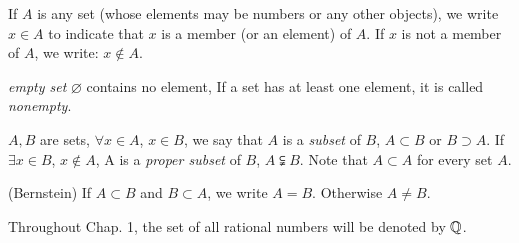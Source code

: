 



\begin{mydef}
    \label{mydef:1.3}
    If $A$ is any set (whose elements may be numbers or any other objects), 
    we write $x\in A$ to indicate that $x$ is a member (or an element) of $A$.
    If $x$ is not a member of $A$, we write: $x\notin A$.

    \emph{empty set} $\varnothing$ contains no element, If a set has at least one element, it is called \emph{nonempty}.

    $A,B$ are sets, 
    $\forall x\in A$, $x\in B$, we say that $A$ is a \emph{subset} of $B$, $A \subset B$ or $B \supset A$. 
    If $\exists x\in B$, $x\notin A$, A is a \emph{proper subset} of $B$, $A \subsetneqq B$.
    Note that $A\subset A$ for every set $A$.

    (Bernstein) If $A\subset B$ and $B\subset A$, we write $A = B$. Otherwise $A \neq B$.
\end{mydef}

\begin{mydef}
    \label{mydef:1.4}
    Throughout Chap. 1, the set of all rational numbers will be denoted by ${\protect\mathbb Q} $.
\end{mydef}